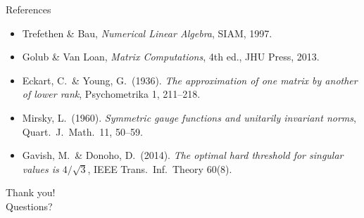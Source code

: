 \documentclass[10pt,aspectratio=169]{beamer}
\begin{document}
\begin{frame}{References}
  \footnotesize
  \begin{itemize}
    \item Trefethen \& Bau, \emph{Numerical Linear Algebra}, SIAM, 1997.
    \item Golub \& Van Loan, \emph{Matrix Computations}, 4th ed., JHU Press, 2013.
    \item Eckart, C.\ \& Young, G.\ (1936). \emph{The approximation of one matrix by another of lower rank}, Psychometrika 1, 211--218.
    \item Mirsky, L.\ (1960). \emph{Symmetric gauge functions and unitarily invariant norms}, Quart.\ J.\ Math.\ 11, 50--59.
    \item Gavish, M.\ \& Donoho, D.\ (2014). \emph{The optimal hard threshold for singular values is $4/\sqrt{3}$}, IEEE Trans.\ Inf.\ Theory 60(8).
  \end{itemize}
\end{frame}

\begin{frame}
  \centering
  \vspace{1cm}
  {\Huge Thank you!}\\[1cm]
  {\Large Questions?}
\end{frame}
\end{document}
